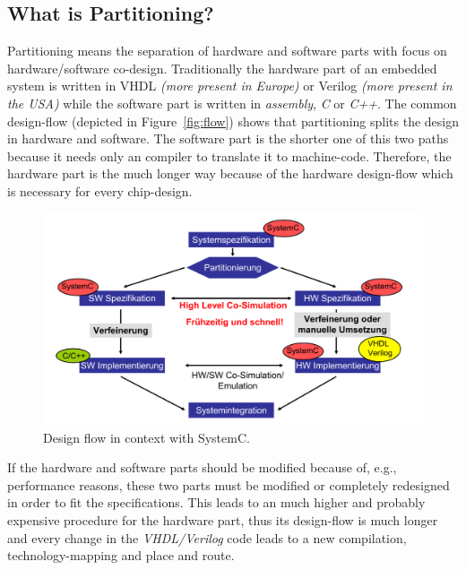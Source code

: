 \documentclass{article}
\begin{document}
	
	  \subsection{What is Partitioning?}
	  Partitioning means the separation of hardware and software parts with focus on hardware/software co-design.
	  Traditionally the hardware part of an embedded system is written in VHDL \textit{(more present in Europe)} or Verilog \textit{(more present in the USA)} while the software part is written in \textit{assembly}, \textit{C} or \textit{C++}.
	  The common design-flow (depicted in Figure~\ref{fig:flow}) shows that partitioning splits the design in hardware and software.
	  The software part is the shorter one of this two paths because it needs only an compiler to translate it to machine-code. Therefore, the hardware part is the much longer way because of the hardware design-flow which is necessary for every chip-design.
	    \begin{figure}[h]
	      \centering
	      \includegraphics[scale=0.18]{../pictures/design_flow.pdf}
	      \caption{Design flow in context with SystemC.}
	      \label{fig:partitioning_sysc}
	    \end{figure}  
	  If the hardware and software parts should be modified because of, e.g., performance reasons, these two parts must be modified or completely redesigned in order to fit the specifications.
	  This leads to an much higher and probably expensive procedure for the hardware part, thus its design-flow is much longer and every change in the \textit{VHDL/Verilog} code leads to a new compilation, technology-mapping and place and route. %
	
\end{document}
